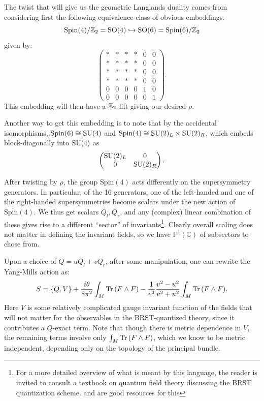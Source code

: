 	The twist that will give us the geometric Langlands duality comes from considering first the following equivalence-class of obvious embeddings.
	$$\mathrm{Spin}(4)/\mathbb{Z}_2 = \mathrm{SO}(4) \hookrightarrow \mathrm{SO}(6) = \mathrm{Spin}(6)/\mathbb{Z}_2$$
	given by:
	\[
		\begin{pmatrix}
			* & * & * & * & 0 & 0 \\
			* & * & * & * & 0 & 0 \\
			* & * & * & * & 0 & 0 \\
			* & * & * & * & 0 & 0 \\
			0 & 0 & 0 & 0 & 1 & 0 \\
			0 & 0 & 0 & 0 & 0 & 1
		\end{pmatrix}.
	\]
	This embedding will then have a $\mathbb{Z}_2$ lift giving our desired $\rho$. 
	
	Another way to get this embedding is to note that by the accidental isomorphisms, $\mathrm{Spin}(6) \cong \mathrm{SU}(4)$ and $\mathrm{Spin}(4) \cong \mathrm{SU}(2)_L \times \mathrm{SU}(2)_R$, which embeds block-diagonally into $\mathrm{SU}(4)$ as
	\[
		\begin{pmatrix}
			\mathrm{SU}(2)_L & 0 \\
			0 & \mathrm{SU}(2)_R
		\end{pmatrix}.
	\]
	
	After twisting by $\rho$, the group $\mathrm{Spin}(4)$ acts differently on the supersymmetry generators. In particular, of the 16 generators, one of the left-handed and one of the right-handed supersymmetries become scalars under the new action of $\mathrm{Spin}(4)$. We thus get scalars $Q_l, Q_r$, and any (complex) linear combination of these gives rise to a different ``sector'' of invariants\footnote{For a more detailed overview of what is meant by this language, the reader is invited to consult a textbook on quantum field theory discussing the BRST quantization scheme. \cite{van2005aspects} and \cite{weinberg1995quantum} are good resources for this}. Clearly overall scaling does not matter in defining the invariant fields, so we have $\mathbb P^1 (\mathbb C)$ of subsectors to chose from.
	
	Upon a choice of $Q = u Q_l + v Q_r$, after some manipulation, one can rewrite the Yang-Mills action as:
	\begin{equation}
		S = \{ Q , V \} + \frac{i \theta}{8\pi^2} \int_M \mathrm{Tr}\,(F \wedge F) - \frac{1}{e^2} \frac{v^2-u^2}{v^2+u^2} \int_M \mathrm{Tr}\, (F \wedge F).
	\end{equation}
	Here $V$ is some relatively complicated gauge invariant function of the fields that will not matter for the observables in the BRST-quantized theory, since it contributes a $Q$-exact term. Note that though there is metric dependence in $V$, the remaining terms involve only $\int_M \mathrm{Tr}\, (F \wedge F)$, which we know to be metric independent, depending only on the topology of the principal bundle. 
	
